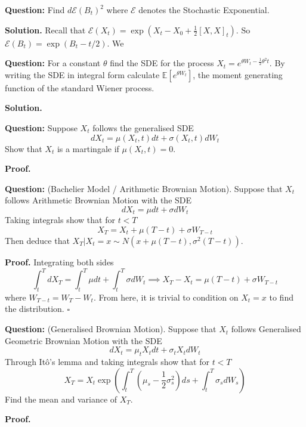 \documentclass{article}
\begin{document}
\begin{tcolorbox}[colframe=black,colback=gray!5,boxrule=0.5pt]
\textbf{Question:} Find $d\mathcal{E}(B_t)^2$ where $\mathcal{E}$ denotes the Stochastic Exponential.
\end{tcolorbox}
\textbf{Solution.} Recall that $\mathcal{E}(X_t) = \exp(X_t - X_0 + \frac{1}{2}[X,X]_t)$. So $\mathcal{E}(B_t) = \exp(B_t - t/2).$ We 

\begin{tcolorbox}[colframe=black,colback=gray!5,boxrule=0.5pt]
\textbf{Question:} For a constant $\theta$ find the SDE for the process $X_t = e^{\theta W_t - \frac{1}{2}\theta^2 t}$. By writing the SDE in integral form calculate $\mathbb{E}[e^{\theta W_t}]$, the moment generating function of the standard Wiener process. 
\end{tcolorbox}
\textbf{Solution.}

\begin{tcolorbox}[colframe=black,colback=gray!5,boxrule=0.5pt]
\textbf{Question:} Suppose $X_t$ follows the generalised SDE 
$$dX_t = \mu(X_t,t)dt + \sigma(X_t,t)dW_t$$
Show that $X_t$ is a martingale if $\mu(X_t,t)=0.$
\end{tcolorbox}
\textbf{Proof.}


\begin{tcolorbox}[colframe=black,colback=gray!5,boxrule=0.5pt]
\textbf{Question:} (Bachelier Model / Arithmetic Brownian Motion). Suppose that $X_t$ follows Arithmetic Brownian Motion with the SDE
$$dX_t = \mu dt + \sigma dW_t$$
Taking integrals show that for $t<T$
$$X_T = X_t + \mu(T-t)+\sigma W_{T-t}$$
Then deduce that $X_T|X_t=x\sim N(x+\mu(T-t),\sigma^2(T-t)).$
\end{tcolorbox}
\textbf{Proof.} Integrating both sides 
$$\int_t^TdX_T = \int_t^T\mu dt + \int_t^T\sigma dW_t \implies X_T-X_t=\mu(T-t)+\sigma W_{T-t}$$
where $W_{T-t} = W_T- W_t$. From here, it is trivial to condition on $X_t=x$ to find the distribution. $\square$


\begin{tcolorbox}[colframe=black,colback=gray!5,boxrule=0.5pt]
\textbf{Question:} (Generalised Brownian Motion). Suppose that $X_t$ follows Generalised Geometric Brownian Motion with the SDE
$$dX_t = \mu_tX_tdt + \sigma_tX_t dW_t$$
Through Itô's lemma and taking integrals show that for $t<T$
$$X_T = X_t\exp\left(\int_t^T\left(\mu_s-\frac{1}{2}\sigma_s^2\right)ds + \int_t^T\sigma_s dW_s\right)$$
Find the mean and variance of $X_T$.
\end{tcolorbox}
\textbf{Proof.}
\end{document}
